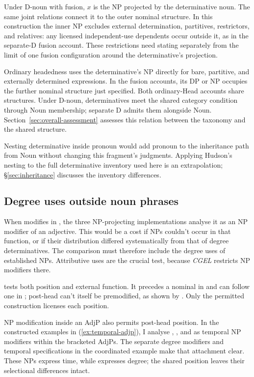 \documentclass[12pt]{article}
\begin{document}
Under D-noun with fusion, $x$ is the NP projected by the determinative noun. The same joint relations connect it to the outer nominal structure. In this construction the inner NP excludes external determination, partitives, restrictors, and relatives: any licensed independent-use dependents occur outside it, as in the separate-D fusion account. These restrictions need stating separately from the limit of one fusion configuration around the determinative's projection.

Ordinary headedness uses the determinative's NP directly for bare, partitive, and externally determined expressions. In the fusion accounts, its DP or NP occupies the further nominal structure just specified. Both ordinary-Head accounts share structures. Under D-noun, determinatives meet the shared category condition through Noun membership; separate D admits them alongside Noun. Section~\ref{sec:overall-assessment} assesses this relation between the taxonomy and the shared structure.

Nesting determinative inside pronoun would add pronoun to the inheritance path from Noun without changing this fragment's judgments. Applying Hudson's nesting to the full determinative inventory used here is an extrapolation; §\ref{sec:inheritance} discusses the inventory differences.


\subsection{Degree uses outside noun phrases}\label{sec:enough}

When  modifies  in , the three NP-projecting implementations analyse it as an NP modifier of an adjective. This would be a cost if NPs couldn't occur in that function, or if their distribution differed systematically from that of degree determinatives. The comparison must therefore include the degree uses of established NPs. Attributive uses are the crucial test, because \textit{CGEL} restricts NP modifiers there.

 tests both position and external function. It precedes a nominal in  and can follow one in ; post-head  can't itself be premodified, as shown by  \citep[396--397, 445]{huddleston2002}. Only the permitted construction licenses each position.

NP modification inside an AdjP also permits post-head position. In the constructed examples in (\ref{ex:temporal-adjp}), I analyse , , and  as temporal NP modifiers within the bracketed AdjPs. The separate degree modifiers and temporal specifications in the coordinated example make that attachment clear. These NPs express time, while  expresses degree; the shared position leaves their selectional differences intact.
\end{document}
